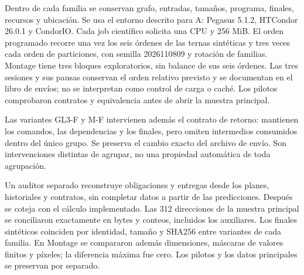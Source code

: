 Dentro de cada familia se conservan grafo, entradas, tamaños, programa, finales, recursos y ubicación. Se usa el entorno descrito para A: Pegasus 5.1.2, HTCondor 26.0.1 y CondorIO. Cada job científico solicita una CPU y 256 MiB. El orden programado recorre una vez los seis órdenes de las ternas sintéticas y tres veces cada orden de particiones, con semilla 2026110809 y rotación de familias. Montage tiene tres bloques exploratorios, sin balance de sus seis órdenes. Las tres sesiones y sus pausas conservan el orden relativo previsto y se documentan en el libro de envíos; no se interpretan como control de carga o caché. Los pilotos comprobaron contratos y equivalencia antes de abrir la muestra principal.

Las variantes GL3-F y M-F intervienen además el contrato de retorno: mantienen los comandos, las dependencias y los finales, pero omiten intermedios consumidos dentro del único grupo. Se preserva el cambio exacto del archivo de envío. Son intervenciones distintas de agrupar, no una propiedad automática de toda agrupación.

Un auditor separado reconstruye obligaciones y entregas desde los planes, historiales y contratos, sin completar datos a partir de las predicciones. Después se coteja con el cálculo implementado. Las 312 direcciones de la muestra principal se conciliaron exactamente en bytes y conteos, incluidos los auxiliares. Los finales sintéticos coinciden por identidad, tamaño y SHA256 entre variantes de cada familia. En Montage se compararon además dimensiones, máscaras de valores finitos y píxeles; la diferencia máxima fue cero. Los pilotos y los datos principales se preservan por separado.

